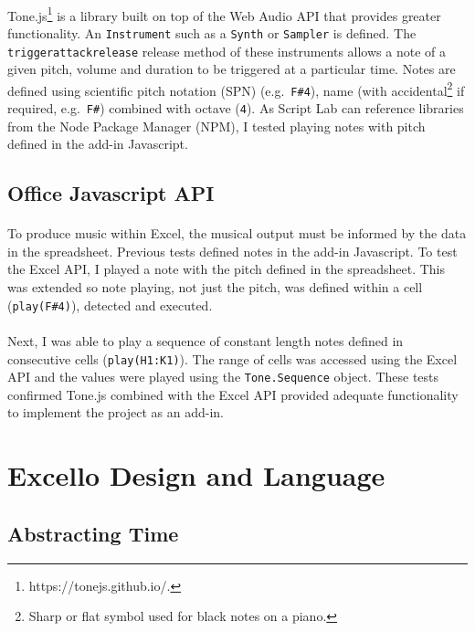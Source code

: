 \paragraph{} Tone.js\footnote{https://tonejs.github.io/.} is a library built on top of the Web Audio API that provides greater functionality. An \texttt{Instrument} such as a \texttt{Synth} or \texttt{Sampler} is defined. The \texttt{triggerattackrelease} release method of these instruments allows a note of a given pitch, volume and duration to be triggered at a particular time. Notes are defined using scientific pitch notation (SPN) (e.g.~\texttt{F\#4}), name (with accidental\footnote{Sharp or flat symbol used for black notes on a piano.} if required, e.g.~\texttt{F\#}) combined with octave (\texttt{4}). As Script Lab can reference libraries from the Node Package Manager (NPM), I tested playing notes with pitch defined in the add-in Javascript.

\subsection{Office Javascript API}

\paragraph{} To produce music within Excel, the musical output must be informed by the data in the spreadsheet. Previous tests defined notes in the add-in Javascript. To test the Excel API, I played a note with the pitch defined in the spreadsheet. This was extended so note playing, not just the pitch, was defined within a cell (\texttt{play(F\#4)}), detected and executed.

\paragraph{} Next, I was able to play a sequence of constant length notes defined in consecutive cells (\texttt{play(H1:K1)}). The range of cells was accessed using the Excel API and the values were played using the \texttt{Tone.Sequence} object. These tests confirmed Tone.js combined with the Excel API provided adequate functionality to implement the project as an add-in.

\section{Excello Design and Language}

\subsection{Abstracting Time}

